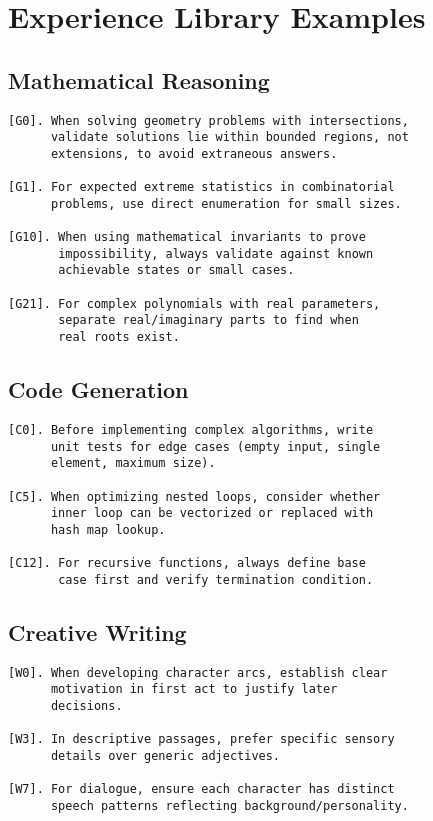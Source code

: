 \documentclass[11pt,a4paper]{article}
\begin{document}
\appendix

\section{Experience Library Examples}

\subsection{Mathematical Reasoning}

\begin{verbatim}
[G0]. When solving geometry problems with intersections,
      validate solutions lie within bounded regions, not
      extensions, to avoid extraneous answers.

[G1]. For expected extreme statistics in combinatorial
      problems, use direct enumeration for small sizes.

[G10]. When using mathematical invariants to prove
       impossibility, always validate against known
       achievable states or small cases.

[G21]. For complex polynomials with real parameters,
       separate real/imaginary parts to find when
       real roots exist.
\end{verbatim}

\subsection{Code Generation}

\begin{verbatim}
[C0]. Before implementing complex algorithms, write
      unit tests for edge cases (empty input, single
      element, maximum size).

[C5]. When optimizing nested loops, consider whether
      inner loop can be vectorized or replaced with
      hash map lookup.

[C12]. For recursive functions, always define base
       case first and verify termination condition.
\end{verbatim}

\subsection{Creative Writing}

\begin{verbatim}
[W0]. When developing character arcs, establish clear
      motivation in first act to justify later
      decisions.

[W3]. In descriptive passages, prefer specific sensory
      details over generic adjectives.

[W7]. For dialogue, ensure each character has distinct
      speech patterns reflecting background/personality.
\end{verbatim}
\end{document}
